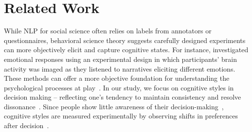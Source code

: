 \section{Related Work}
While NLP for social science often relies on labels from annotators or questionnaires, behavioral science theory suggests carefully designed experiments can more objectively elicit and capture cognitive states.
For instance, \citet{saxbe2013embodiment} investigated emotional responses using an experimental design in which participants' brain activity was imaged as they listened to narratives eliciting different emotions. These methods can offer a more objective foundation for understanding the psychological processes at play~\citep{brook2015linking}. In our study, we focus on cognitive styles in decision making -- reflecting one's tendency to maintain consistency and resolve dissonance~\citep{harmon2007cognitive,mcgrath2017dealing}. %
Since people show little awareness of their decision-making~\cite{nisbett1977halo}, 
 cognitive styles are measured experimentally by observing shifts in preferences after decision~\citep{simon2004construction,aguilar2022cognitive}. 

